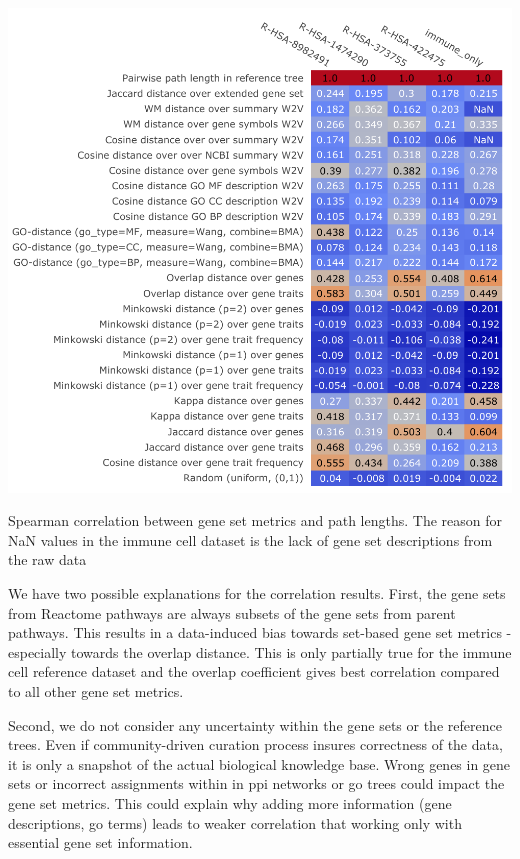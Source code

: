 \documentclass{thesisclass}
\begin{document}
\begin{centeredFigure}[!ht]
	\includegraphics[scale=0.85]{figures/results/plots/summary/spearman.pdf}
	\caption[Spearman correlation between gene set metrics and path lengths]{Spearman correlation between gene set metrics and path lengths. The reason for NaN values in the immune cell dataset is the lack of gene set descriptions from the raw data}
	\label{fig:spearman}
\end{centeredFigure}

We have two possible explanations for the correlation results. 
First, the gene sets from Reactome pathways are always subsets of the gene sets from parent pathways. 
This results in a data-induced bias towards set-based gene set metrics - especially towards the overlap distance. 
This is only partially true for the immune cell reference dataset and the overlap coefficient gives best correlation compared to all other gene set metrics.

Second, we do not consider any uncertainty within the gene sets or the reference trees. 
Even if community-driven curation process insures correctness of the data, it is only a snapshot of the actual biological knowledge base. 
Wrong genes in gene sets or incorrect assignments within in \acrshort{ppi} networks or \acrshort{go} trees could impact the gene set metrics.
This could explain why adding more information (gene descriptions, \acrfull{go} terms) leads to weaker correlation that working only with essential gene set information.
\end{document}
